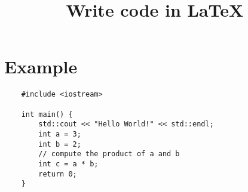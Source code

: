 \documentclass[a4paper, 12pt]{article}
\title{Write code in LaTeX}
\date{}
\begin{document}
	
\maketitle


\section{Example}

\begin{lstlisting}
	#include <iostream>
	
	int main() {
		std::cout << "Hello World!" << std::endl;
		int a = 3;
		int b = 2;
		// compute the product of a and b
		int c = a * b;
		return 0;
	}
\end{lstlisting}
\end{document}
